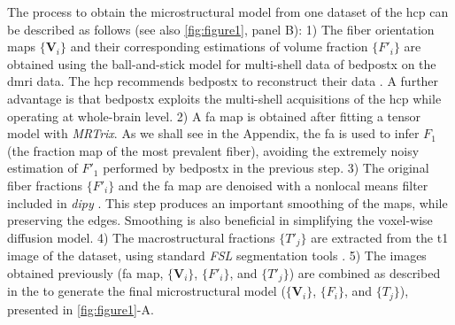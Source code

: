 \documentclass[english]{frontiers/frontiersSCNS} %
\begin{document}
The process to obtain the microstructural model from one dataset of the \gls*{hcp} can be described
  as follows (see also \autoref{fig:figure1}, panel B):
1) The fiber orientation maps $\{\mathbf{V}_i\}$ and their corresponding estimations of volume fraction $\{F'_i\}$ are
  obtained using the ball-and-stick model for multi-shell data of \gls*{bedpostx}
  on the \gls*{dmri} data.
The \gls*{hcp} recommends \gls*{bedpostx} to reconstruct their data \citep{glasser_minimal_2013}.
A further advantage is that \gls*{bedpostx} exploits the multi-shell acquisitions of the \gls*{hcp} while
  operating at whole-brain level.
2) A \gls*{fa} map is obtained after fitting a tensor model with \emph{MRTrix}.
As we shall see in the Appendix, the \gls*{fa} is used to infer $F_1$ (the fraction map of the most prevalent fiber),
  avoiding the extremely noisy estimation of $F'_1$ performed by \gls*{bedpostx} in the previous step.
3) The original fiber fractions $\{F'_i\}$ and the \gls*{fa} map are denoised with a nonlocal means filter included
  in \emph{dipy} \citep{garyfallidis_dipy_2014}.
This step produces an important smoothing of the maps, while preserving the edges.
Smoothing is also beneficial in simplifying the voxel-wise diffusion model.
4) The macrostructural fractions $\{T'_j\}$ are extracted from the \acrlong*{t1} image of the dataset,
  using standard \emph{FSL} segmentation tools \citep{jenkinson_fsl_2012}.
5) The images obtained previously (\gls*{fa} map, $\{\mathbf{V}_i\}$, $\{F'_i\}$, and $\{T'_j\}$)
  are combined as described in the  to generate the final microstructural model
  ($\{\mathbf{V}_i\}$, $\{F_i\}$, and $\{T_j\}$), presented in \autoref{fig:figure1}-A.
\end{document}
